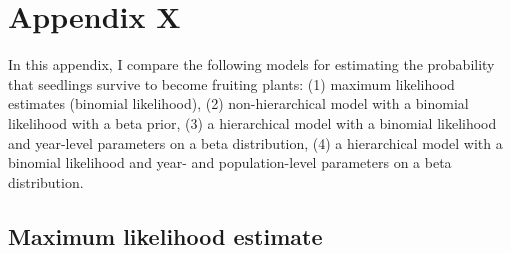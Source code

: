 \documentclass[12pt, oneside, titlepage]{article}   	%
\begin{document}
 

\section*{Appendix X}


In this appendix, I compare the following models for estimating the probability that seedlings survive to become fruiting plants: (1) maximum likelihood estimates (binomial likelihood), (2) non-hierarchical model with a binomial likelihood with a beta prior, (3) a hierarchical model with a binomial likelihood and year-level parameters on a beta distribution, (4) a hierarchical model with a binomial likelihood and year- and population-level parameters on a beta distribution.

\subsection*{Maximum likelihood estimate}

\end{document}

